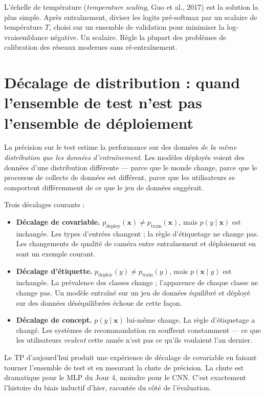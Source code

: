 L'échelle de température (\emph{temperature scaling}, Guo et al., 2017) est la solution la plus simple. Après entraînement, diviser les logits pré-softmax par un scalaire de température $T$, choisi sur un ensemble de validation pour minimiser la log-vraisemblance négative. Un scalaire. Règle la plupart des problèmes de calibration des réseaux modernes sans ré-entraînement.

\section{Décalage de distribution : quand l'ensemble de test n'est pas l'ensemble de déploiement}

La précision sur le test estime la performance sur des données \emph{de la même distribution que les données d'entraînement}. Les modèles déployés voient des données d'une distribution différente --- parce que le monde change, parce que le processus de collecte de données est différent, parce que les utilisateurs se comportent différemment de ce que le jeu de données suggérait.

Trois décalages courants :

\begin{itemize}
  \item \textbf{Décalage de covariable.} $p_{\text{deploy}}(\bm{x}) \neq p_{\text{train}}(\bm{x})$, mais $p(y \mid \bm{x})$ est inchangée. Les types d'entrées changent ; la règle d'étiquetage ne change pas. Les changements de qualité de caméra entre entraînement et déploiement en sont un exemple courant.
  \item \textbf{Décalage d'étiquette.} $p_{\text{deploy}}(y) \neq p_{\text{train}}(y)$, mais $p(\bm{x} \mid y)$ est inchangée. La prévalence des classes change ; l'apparence de chaque classe ne change pas. Un modèle entraîné sur un jeu de données équilibré et déployé sur des données déséquilibrées échoue de cette façon.
  \item \textbf{Décalage de concept.} $p(y \mid \bm{x})$ lui-même change. La règle d'étiquetage a changé. Les systèmes de recommandation en souffrent constamment --- ce que les utilisateurs \emph{veulent} cette année n'est pas ce qu'ils voulaient l'an dernier.
\end{itemize}

Le TP d'aujourd'hui produit une expérience de décalage de covariable en faisant tourner l'ensemble de test et en mesurant la chute de précision. La chute est dramatique pour le MLP du Jour 4, moindre pour le CNN. C'est exactement l'histoire du biais inductif d'hier, racontée du côté de l'évaluation.

